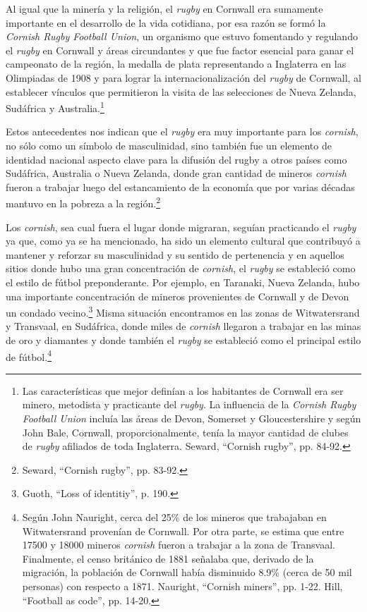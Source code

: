 \documentclass[11pt,a5paper,twoside]{book} %
\begin{document}
Al igual que la minería y la religión, el \emph{rugby} en Cornwall era sumamente importante en el desarrollo de la vida cotidiana, por esa razón se formó la \emph{Cornish Rugby Football Union}, un organismo que estuvo fomentando y regulando el \emph{rugby} en Cornwall y áreas circundantes y que fue factor esencial para ganar el campeonato de la región, la medalla de plata representando a Inglaterra en las Olimpiadas de 1908 y para lograr la internacionalización del \emph{rugby} de Cornwall, al establecer vínculos que permitieron la visita de las selecciones de Nueva Zelanda, Sudáfrica y Australia.\footnote{Las características que mejor definían a los habitantes de Cornwall era ser minero, metodista y practicante del \emph{rugby}. La influencia de la \emph{Cornish Rugby Football Union} incluía las áreas de Devon, Somerset y Gloucestershire y según John Bale, Cornwall, proporcionalmente, tenía la mayor cantidad de clubes de \emph{rugby} afiliados de toda Inglaterra. Seward, ``Cornish rugby'', pp. 84-92.}

Estos antecedentes nos indican que el \emph{rugby} era muy importante para los \emph{cornish}, no sólo como un símbolo de masculinidad, sino también fue un elemento de identidad nacional aspecto clave para la difusión del rugby a otros países como Sudáfrica, Australia o Nueva Zelanda, donde gran cantidad de mineros \emph{cornish} fueron a trabajar luego del estancamiento de la economía que por varias décadas mantuvo en la pobreza a la región.\footnote{Seward, ``Cornish rugby'', pp. 83-92.}

Los \emph{cornish}, sea cual fuera el lugar donde migraran, seguían practicando el \emph{rugby} ya que, como ya se ha mencionado, ha sido un elemento cultural que contribuyó a mantener y reforzar su masculinidad y su sentido de pertenencia y en aquellos sitios donde hubo una gran concentración de \emph{cornish}, el \emph{rugby} se estableció como el estilo de fútbol preponderante. Por ejemplo, en Taranaki, Nueva Zelanda, hubo una importante concentración de mineros provenientes de Cornwall y de Devon un condado vecino.\footnote{Guoth, ``Loss of identitiy'', p. 190.} Misma situación encontramos en las zonas de Witwatersrand y Transvaal, en Sudáfrica, donde miles de \emph{cornish} llegaron a trabajar en las minas de oro y diamantes y donde también el \emph{rugby} se estableció como el principal estilo de fútbol.\footnote{Según John Nauright, cerca del 25\% de los mineros que trabajaban en Witwatersrand provenían de Cornwall. Por otra parte, se estima que entre 17500 y 18000 mineros \emph{cornish} fueron a trabajar a la zona de Transvaal. Finalmente, el censo británico de 1881 señalaba que, derivado de la migración, la población de Cornwall había disminuido 8.9\% (cerca de 50 mil personas) con respecto a 1871. Nauright, ``Cornish miners'', pp. 1-22. Hill, ``Football as code'', pp. 14-20.}
\end{document}
